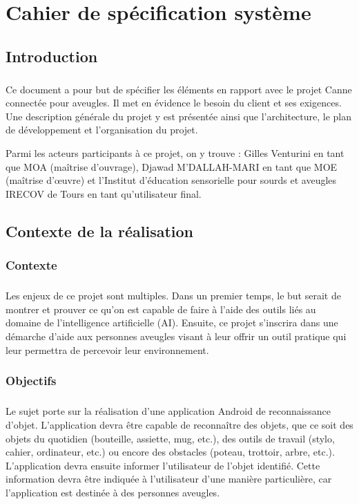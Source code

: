 \documentclass[CDS,UTF8,final]{EPURapport}
\begin{document}
\chapter{Cahier de spécification système}
\section{Introduction}
\paragraph{}
Ce document a pour but de spécifier les éléments en rapport avec le projet Canne connectée pour aveugles. Il met en évidence le besoin du client et ses exigences. Une description générale du projet y est présentée ainsi que l’architecture, le plan de développement et l’organisation du projet.

Parmi les acteurs participants à ce projet, on y trouve : Gilles Venturini en tant que MOA (maîtrise d’ouvrage), Djawad M’DALLAH-MARI en tant que MOE (maîtrise d’œuvre) et l’Institut d’éducation sensorielle pour sourds et aveugles IRECOV de Tours en tant qu’utilisateur final.

\section{Contexte de la réalisation}
\subsection{Contexte}
\paragraph{}
Les enjeux de ce projet sont multiples. Dans un premier temps, le but serait de montrer et prouver ce qu’on est capable de faire à l’aide des outils liés au domaine de l’intelligence artificielle (AI). Ensuite, ce projet s’inscrira dans une démarche d’aide aux personnes aveugles visant à leur offrir un outil pratique qui leur permettra de percevoir leur environnement.
\subsection{Objectifs}
\paragraph{}
Le sujet porte sur la réalisation d’une application Android de reconnaissance d’objet. L’application devra être capable de reconnaître des objets, que ce soit des objets du quotidien (bouteille, assiette, mug, etc.), des outils de travail (stylo, cahier, ordinateur, etc.) ou encore des obstacles (poteau, trottoir, arbre, etc.). L’application devra ensuite informer l’utilisateur de l’objet identifié. Cette information devra être indiquée à l’utilisateur d’une manière particulière, car l’application est destinée à des personnes aveugles.\par
\end{document}
